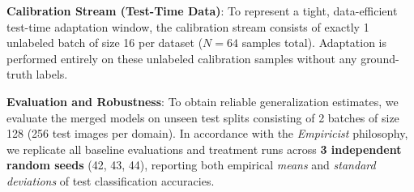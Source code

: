 \textbf{Calibration Stream (Test-Time Data)}: To represent a tight, data-efficient test-time adaptation window, the calibration stream consists of exactly 1 unlabeled batch of size 16 per dataset ($N = 64$ samples total). Adaptation is performed entirely on these unlabeled calibration samples without any ground-truth labels.

\textbf{Evaluation and Robustness}: To obtain reliable generalization estimates, we evaluate the merged models on unseen test splits consisting of 2 batches of size 128 (256 test images per domain). In accordance with the \emph{Empiricist} philosophy, we replicate all baseline evaluations and treatment runs across \textbf{3 independent random seeds} (42, 43, 44), reporting both empirical \emph{means} and \emph{standard deviations} of test classification accuracies.

